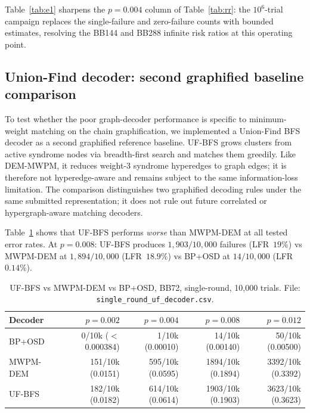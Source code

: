 \documentclass[11pt,a4paper]{article}
\begin{document}
Table~\ref{tab:e1} sharpens the $p=0.004$ column of
Table~\ref{tab:rr}: the $10^{6}$-trial campaign replaces the
single-failure and zero-failure counts with bounded estimates,
resolving the BB144 and BB288 infinite risk ratios at this operating
point.

\subsection{Union-Find decoder: second graphified baseline comparison}
\label{ssec:uf}

To test whether the poor graph-decoder performance is specific to minimum-weight
matching on the chain graphification, we implemented a Union-Find BFS decoder
as a second graphified reference baseline.
UF-BFS grows clusters from active syndrome nodes via breadth-first search and
matches them greedily.
Like DEM-MWPM, it reduces weight-3 syndrome hyperedges to graph edges; it is
therefore not hyperedge-aware and remains subject to the same information-loss
limitation.
The comparison distinguishes two graphified decoding rules under the same
submitted representation; it does not rule out future correlated or hypergraph-aware
matching decoders.

Table~\ref{tab:uf} shows that UF-BFS performs \emph{worse} than MWPM-DEM
at all tested error rates.
At $p=0.008$: UF-BFS produces $1{,}903/10{,}000$ failures (LFR~$19\%$)
vs MWPM-DEM at $1{,}894/10{,}000$ (LFR~$18.9\%$) vs BP+OSD at $14/10{,}000$
(LFR~$0.14\%$).

\begin{table}[H]\centering\small
\caption{UF-BFS vs MWPM-DEM vs BP+OSD, BB72, single-round, 10{,}000 trials.
  File: \texttt{single\_round\_uf\_decoder.csv}.}
\label{tab:uf}
\begin{tabular}{@{}lrrrr@{}}
\toprule
Decoder & $p=0.002$ & $p=0.004$ & $p=0.008$ & $p=0.012$ \\
\midrule
BP+OSD   & 0/10k ($<$0.000384) & 1/10k (0.00010) & 14/10k (0.00140) & 50/10k (0.00500) \\
MWPM-DEM & 151/10k (0.0151) & 595/10k (0.0595) & 1894/10k (0.1894) & 3392/10k (0.3392) \\
UF-BFS   & 182/10k (0.0182) & 614/10k (0.0614) & 1903/10k (0.1903) & 3623/10k (0.3623) \\
\bottomrule
\end{tabular}
\end{table}
\end{document}
